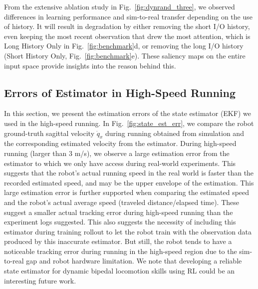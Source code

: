 From the extensive ablation study in Fig.~\ref{fig:dynrand_three}, we observed differences in learning performance and sim-to-real transfer depending on the use of history.
It will result in degradation by either removing the short I/O history, even keeping the most recent observation that drew the most attention, which is Long History Only in Fig.~\ref{fig:benchmark}d, or removing the long I/O history (Short History Only, Fig.~\ref{fig:benchmark}e). These saliency maps on the entire input space provide insights into the reason behind this.




\subsection{Errors of Estimator in High-Speed Running}\label{appendix:estimaion_error}

In this section, we present the estimation errors of the state estimator (EKF) we used in the high-speed running. In Fig.~\ref{fig:state_est_err}, we compare the robot ground-truth sagittal velocity $\dot{q}_x$ during running obtained from simulation and the corresponding estimated velocity from the estimator. During high-speed running (larger than 3 m/s), we observe a large estimation error from the estimator to which we only have access during real-world experiments. This suggests that the robot's actual running speed in the real world is faster than the recorded estimated speed, and may be the upper envelope of the estimation. This large estimation error is further supported when comparing the estimated speed and the robot's actual average speed (traveled distance/elapsed time). These suggest a smaller actual tracking error during high-speed running than the experiment logs suggested. This also suggests the necessity of including this estimator during training rollout to let the robot train with the observation data produced by this inaccurate estimator. But still, the robot tends to have a noticeable tracking error during running in the high-speed region due to the sim-to-real gap and robot hardware limitation. We note that developing a reliable state estimator for dynamic bipedal locomotion skills using RL could be an interesting future work.



